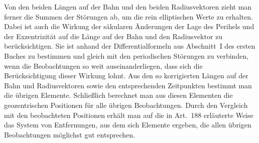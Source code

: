 Von den beiden Längen auf der Bahn und den beiden Radiusvektoren zieht man
ferner die Summen der Störungen ab, um die rein elliptischen Werte zu
erhalten. Dabei ist auch die Wirkung der säkularen Änderungen der
Lage des Perihels und der Exzentrizität auf die Länge auf der Bahn und
den Radiusvektor zu berücksichtigen. Sie ist anhand der
Differentialformeln aus Abschnitt~I des ersten Buches zu bestimmen und
gleich mit den periodischen Störungen zu verbinden, wenn die
Beobachtungen so weit auseinanderliegen, dass sich die Berücksichtigung
dieser Wirkung lohnt. Aus den so korrigierten Längen auf der Bahn und
Radiusvektoren sowie den entsprechenden Zeitpunkten bestimmt man die
übrigen Elemente. Schließlich berechnet man aus diesen Elementen die
geozentrischen Positionen für alle übrigen Beobachtungen. Durch den
Vergleich mit den beobachteten Positionen erhält man auf die in
Art.~188 erläuterte Weise das System von Entfernungen, aus dem sich
Elemente ergeben, die allen übrigen Beobachtungen möglichst gut
entsprechen.
